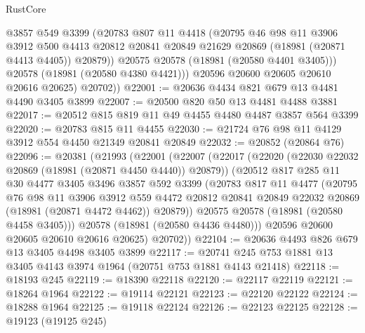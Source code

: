 \begin{lexlean}{RustCore}
\begin{coremodule}
              @3857
              @549
              @3399
              (@20783
                @807
                @11
                @4418
                (@20795
                  @46
                  @98
                  @11
                  @3906
                  @3912
                  @500
                  @4413
                  @20812
                  @20841
                  @20849
                  @21629
                  @20869
                  (@18981 (@20871 @4413 @4405))
                  @20879))
              @20575
              @20578
              (@18981 (@20580 @4401 @3405)))
            @20578
            (@18981 (@20580 @4380 @4421)))
          @20596
          @20600
          @20605
          @20610
          @20616
          @20625)
        @20702))
@22001 := @20636 @4434 @821 @679 @13 @4481 @4490 @3405 @3899
@22007 := @20500 @820 @50 @13 @4481 @4488 @3881
@22017 := @20512 @815 @819 @11 @49 @4455 @4480 @4487 @3857 @564 @3399
@22020 := @20783 @815 @11 @4455
@22030 := @21724 @76 @98 @11 @4129 @3912 @554 @4450 @21349 @20841 @20849
@22032 := @20852 (@20864 @76)
@22096 := @20381
    (@21993
      (@22001
        (@22007
          (@22017
            (@22020 (@22030 @22032 @20869 (@18981 (@20871 @4450 @4440)) @20879))
            (@20512
              @817
              @285
              @11
              @30
              @4477
              @3405
              @3496
              @3857
              @592
              @3399
              (@20783
                @817
                @11
                @4477
                (@20795
                  @76
                  @98
                  @11
                  @3906
                  @3912
                  @559
                  @4472
                  @20812
                  @20841
                  @20849
                  @22032
                  @20869
                  (@18981 (@20871 @4472 @4462))
                  @20879))
              @20575
              @20578
              (@18981 (@20580 @4458 @3405)))
            @20578
            (@18981 (@20580 @4436 @4480)))
          @20596
          @20600
          @20605
          @20610
          @20616
          @20625)
        @20702))
@22104 := @20636 @4493 @826 @679 @13 @3405 @4498 @3405 @3899
@22117 := @20741 @245 @753 @1881 @13 @3405 @4143 @3974 @1964 (@20751 @753 @1881 @4143 @21418)
@22118 := @18193 @245
@22119 := @18390 @22118
@22120 := @22117 @22119
@22121 := @18264 @1964
@22122 := @19114 @22121
@22123 := @22120 @22122
@22124 := @18288 @1964
@22125 := @19118 @22124
@22126 := @22123 @22125
@22128 := @19123 (@19125 @245)

\end{coremodule}
\end{lexlean}
